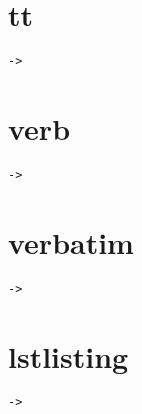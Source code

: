 \documentclass{article}
\begin{document}
\section{tt}

{\tt ->}

\section{verb}

\verb|->|

\section{verbatim}

\begin{verbatim}
->
\end{verbatim}

\section{lstlisting}

\begin{lstlisting}
->
\end{lstlisting}
\end{document}

